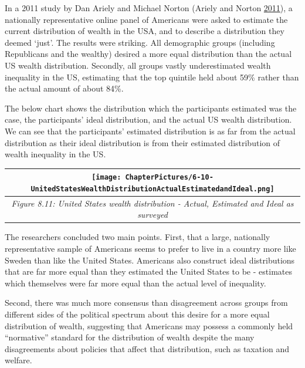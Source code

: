 \documentclass[]{tufte-handout}
\begin{document}
In a 2011 study by Dan Ariely and Michael Norton (Ariely and Norton
\protect\hyperlink{ref-Norton2011}{2011}), a nationally representative
online panel of Americans were asked to estimate the current
distribution of wealth in the USA, and to describe a distribution they
deemed `just'. The results were striking. All demographic groups
(including Republicans and the wealthy) desired a more equal
distribution than the actual US wealth distribution. Secondly, all
groups vastly underestimated wealth inequality in the US, estimating
that the top quintile held about 59\% rather than the actual amount of
about 84\%.

The below chart shows the distribution which the participants estimated
was the case, the participants' ideal distribution, and the actual US
wealth distribution. We can see that the participants' estimated
distribution is as far from the actual distribution as their ideal
distribution is from their estimated distribution of wealth inequality
in the US.

\begin{longtable}[]{@{}c@{}}
\toprule
\begin{minipage}[b]{0.97\columnwidth}\centering
\texttt{[image: ChapterPictures/6-10-UnitedStatesWealthDistributionActualEstimatedandIdeal.png]}\strut
\end{minipage}\tabularnewline
\midrule
\endhead
\begin{minipage}[t]{0.97\columnwidth}\centering
\emph{Figure 8.11: United States wealth distribution - Actual, Estimated
and Ideal as surveyed}\strut
\end{minipage}\tabularnewline
\bottomrule
\end{longtable}

The researchers concluded two main points. First, that a large,
nationally representative sample of Americans seems to prefer to live in
a country more like Sweden than like the United States. Americans also
construct ideal distributions that are far more equal than they
estimated the United States to be - estimates which themselves were far
more equal than the actual level of inequality.

Second, there was much more consensus than disagreement across groups
from different sides of the political spectrum about this desire for a
more equal distribution of wealth, suggesting that Americans may possess
a commonly held ``normative'' standard for the distribution of wealth
despite the many disagreements about policies that affect that
distribution, such as taxation and welfare.
\end{document}
